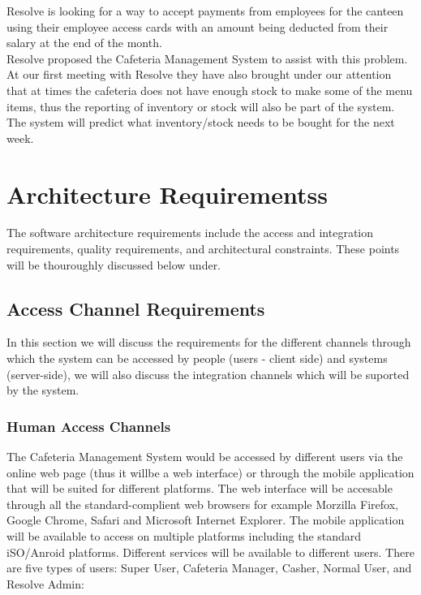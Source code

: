 \documentclass[12pt]{article}
\begin{document}
Resolve is looking for a way to accept payments from employees for the canteen
using their employee access cards with an amount being deducted from their salary at the end of the month.\\

Resolve proposed the Cafeteria Management System to assist with this problem.
At our first meeting with Resolve they have also brought under our attention that at times the cafeteria does not have enough stock to make some of the menu items, thus the reporting of inventory or stock will also be part of the system. The system will predict what inventory/stock needs to be bought for the next week.

\section{Architecture Requirementss}
The software architecture requirements include the access and integration requirements, quality
requirements, and architectural constraints. These points will be thouroughly discussed below under.

\subsection{Access Channel Requirements}
In this section we will discuss the requirements for the different channels through which the system can be accessed by people (users - client side) and systems (server-side), we will also discuss the integration channels which will be suported by the system.


\subsubsection{Human Access Channels}
The Cafeteria Management System would be accessed by different users via  the online web page (thus it willbe a web interface) or through the mobile application that will be suited for different platforms. The web interface will be accesable through all the standard-complient web browsers for example Morzilla Firefox, Google Chrome, Safari and Microsoft Internet Explorer. The mobile application will be available to access on multiple platforms including the standard iSO/Anroid platforms.   Different services will be available to different users. There are five types of users: Super User, Cafeteria Manager, Casher, Normal User, and Resolve Admin: \\
\end{document}
